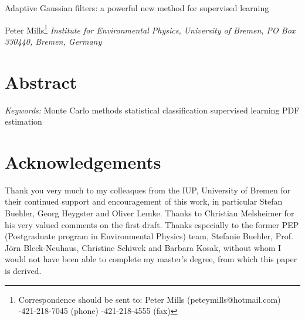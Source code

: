 \documentclass[11pt]{article}
\begin{document}
\begin{center}

{\LARGE Adaptive Gaussian filters: a powerful new method for supervised learning}
\vspace{5mm}

{\large Peter Mills\footnote
{Correspondence should be sent to: \newline
Peter Mills \newline
(peteymills@hotmail.com) -421-218-7045 (phone) -421-218-4555 (fax)}\newline
}
\textit{
Institute for Environmental Physics, \newline
University of Bremen, \newline
PO Box 330440,  Bremen, \newline
Germany}\newline

\end{center}

\begin{flushleft}

\section*{Abstract}

\vspace{3mm}

\emph{Keywords:}\newline
Monte Carlo methods \newline
statistical classification \newline
supervised learning \newline
PDF estimation

\pagebreak

%

\tableofcontents

\parindent=5mm


\section*{Acknowledgements}
Thank you very much to my colleaques from the IUP, University of
Bremen for their continued support and encouragement of this work,
in particular Stefan Buehler, Georg Heygster and Oliver Lemke.  
Thanks to Christian Melsheimer for his very valued comments on the first draft.
Thanks especially to the former PEP (Postgraduate program in
Environmental Physics) team, Stefanie Buehler, Prof. Jörn
Bleck-Neuhaus, Christine Schiwek and Barbara Kosak, without whom
I would not have been able to complete my master's degree, from
which this paper is derived.



\end{flushleft}
\end{document}
